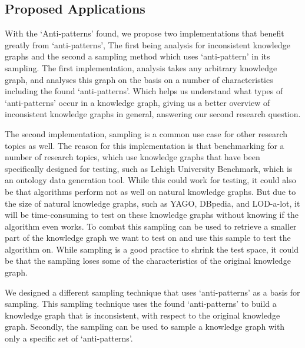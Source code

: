 \documentclass[11pt,letterpaper ,oneside ]{book}
\begin{document}
	\subsection{Proposed Applications}
	With the `Anti-patterns' found, we propose two implementations that benefit greatly from `anti-patterns', The first being analysis for inconsistent knowledge graphs and the second a sampling method which uses `anti-pattern' in its sampling. The first implementation, analysis takes any arbitrary knowledge graph, and analyses this graph on the basis on a number of characteristics including the found `anti-patterns'. Which helps us understand what types of `anti-patterns' occur in a knowledge graph, giving us a better overview of inconsistent knowledge graphs in general, answering our second research question.
	
	The second implementation, sampling is a common use case for other research topics as well. The reason for this implementation is that benchmarking for a number of research topics, which use knowledge graphs that have been specifically designed for testing, such as Lehigh University Benchmark, which is an ontology data generation tool. While this could work for testing, it could also be that algorithms perform not as well on natural knowledge graphs. But due to the size of natural knowledge graphs, such as YAGO, DBpedia, and LOD-a-lot, it will be time-consuming to test on these knowledge graphs without knowing if the algorithm even works. To combat this sampling can be used to retrieve a smaller part of the knowledge graph we want to test on and use this sample to test the algorithm on. While sampling is a good practice to shrink the test space, it could be that the sampling loses some of the characteristics of the original knowledge graph. 
	
	We designed a different sampling technique that uses `anti-patterns' as a basis for sampling. This sampling technique uses the found `anti-patterns' to build a knowledge graph that is inconsistent, with respect to the original knowledge graph. Secondly, the sampling can be used to sample a knowledge graph with only a specific set of `anti-patterns'.
	
\end{document}
